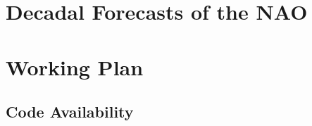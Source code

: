 \documentclass{article}
\begin{document}
\section*{Decadal Forecasts of the NAO}



\section*{Working Plan}


\subsection*{Code Availability}

\printbibliography

\end{document}
